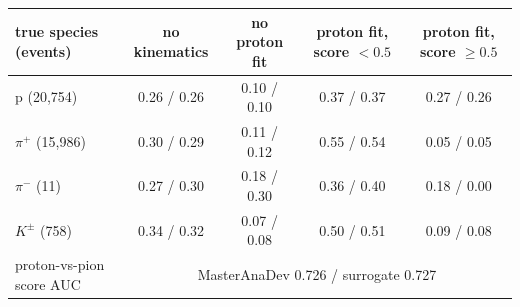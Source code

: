 \begin{tabular}{lcccc}
\toprule
true species (events) & no kinematics & no proton fit & proton fit, score $<0.5$ & proton fit, score $\geq 0.5$ \\
\midrule
p (20,754) & 0.26 / 0.26 & 0.10 / 0.10 & 0.37 / 0.37 & 0.27 / 0.26 \\
$\pi^+$ (15,986) & 0.30 / 0.29 & 0.11 / 0.12 & 0.55 / 0.54 & 0.05 / 0.05 \\
$\pi^-$ (11) & 0.27 / 0.30 & 0.18 / 0.30 & 0.36 / 0.40 & 0.18 / 0.00 \\
$K^\pm$ (758) & 0.34 / 0.32 & 0.07 / 0.08 & 0.50 / 0.51 & 0.09 / 0.08 \\
\midrule
proton-vs-pion score AUC & \multicolumn{4}{c}{MasterAnaDev 0.726 / surrogate 0.727} \\
\bottomrule
\end{tabular}
